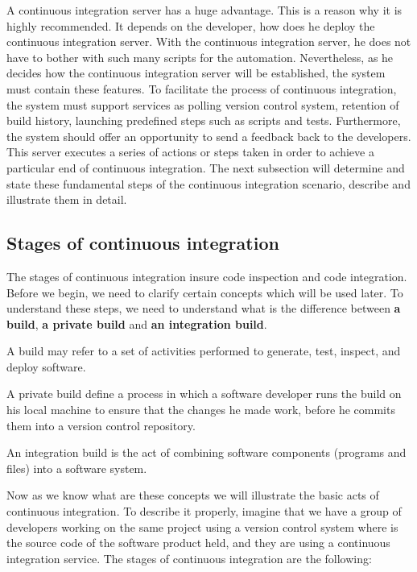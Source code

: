 A continuous integration server has a huge advantage. This is a reason why it is highly recommended. It depends on the developer, how does he deploy the continuous integration server. With the continuous integration server, he does not have to bother with such many scripts for the automation. Nevertheless, as he decides how the continuous integration server will be established, the system must contain these features. To facilitate the process of continuous integration, the system must support services as polling version control system, retention of build history, launching predefined steps such as scripts and tests. Furthermore, the system should offer an opportunity to send a feedback back to the developers. This server executes a series of actions or steps taken in order to achieve a particular end of continuous integration. The next subsection will determine and state these fundamental steps of the continuous integration scenario, describe and illustrate them in detail.

\subsection{Stages of continuous integration}

The stages of continuous integration insure code inspection and code integration. Before we begin, we need to clarify certain concepts which will be used later. To understand these steps, we need to understand what is the difference between \textbf{a build}, \textbf{a private build} and \textbf{an integration build}.

\begin{DEF}
A build may refer to a set of activities performed to generate, test, inspect, and deploy software\cite{CI}.
\end{DEF}

\begin{DEF}
A private build define a process in which a software developer runs the build on his local machine to ensure that the changes he made work, before he commits them into a version control repository.
\end{DEF}

\begin{DEF}
An integration build is the act of combining software components (programs and files) into a software system\cite{CI}.
\end{DEF}

Now as we know what are these concepts we will illustrate the basic acts of continuous integration. To describe it properly, imagine that we have a group of developers working on the same project using a version control system where is the source code of the software product held, and they are using a continuous integration service. The stages of continuous integration are the following:

